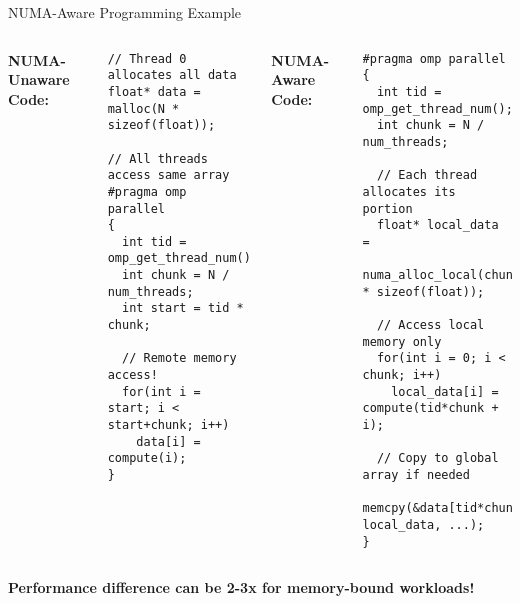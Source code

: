 \documentclass[aspectratio=169,12pt]{beamer}
\begin{document}
\begin{frame}[fragile]{NUMA-Aware Programming Example}
\begin{columns}[T]
\textbf{NUMA-Unaware Code:}
{\small
\begin{verbatim}
// Thread 0 allocates all data
float* data = malloc(N * sizeof(float));

// All threads access same array
#pragma omp parallel
{
  int tid = omp_get_thread_num();
  int chunk = N / num_threads;
  int start = tid * chunk;
  
  // Remote memory access!
  for(int i = start; i < start+chunk; i++)
    data[i] = compute(i);
}
\end{verbatim}
}

\textbf{NUMA-Aware Code:}
{\small
\begin{verbatim}
#pragma omp parallel
{
  int tid = omp_get_thread_num();
  int chunk = N / num_threads;
  
  // Each thread allocates its portion
  float* local_data = 
    numa_alloc_local(chunk * sizeof(float));
  
  // Access local memory only
  for(int i = 0; i < chunk; i++)
    local_data[i] = compute(tid*chunk + i);
    
  // Copy to global array if needed
  memcpy(&data[tid*chunk], local_data, ...);
}
\end{verbatim}
}
\end{columns}

\vspace{0.3cm}
\textbf{Performance difference can be 2-3x for memory-bound workloads!}
\end{frame}
\end{document}
